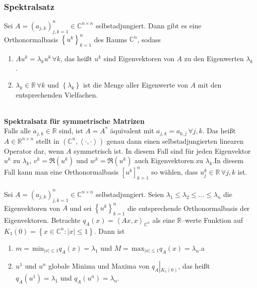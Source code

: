 \documentclass[a4paper,12pt]{article}
\begin{document}
\subsubsection{Spektralsatz}
Sei $A=\left(a_{j,k}\right)_{j,k=1}^n  \in \mathbb{C}^{n\times n}$ selbstadjungiert. Dann gibt es eine Orthonormalbasis $\left\{u^k\right\}_{k=1}^n$ des Raums $\mathbb{C}^n$, sodass
\begin{enumerate}[label=\arabic*.]
        \item $Au^k=\lambda _ku^k\,\forall k$, das heißt $u^k$ sind Eigenvektoren von $A$ zu den Eigenwerten $\lambda _k$.
        \item $\lambda _k \in \mathbb{R}\,\forall k$ und $\left\{\lambda _k\right\}$ ist die Menge aller Eigenwerte von $A$ mit den entsprechenden Vielfachen.
\end{enumerate}
\hfill\\\textbf{Spektralsatz für symmetrische Matrizen}\\ 
Falls alle $a_{j,k} \in \mathbb{R}$ sind, ist $A=A^*$ äquivalent mit $a_{j,k}=a_{k,j}\,\forall j,k$. Das heißt $A \in \mathbb{R}^{n\times n}$ stellt in $\left(\mathbb{C}^n,\left\langle \cdot ,\cdot \right\rangle \right)$ genau dann einen selbstadjungierten linearen Operator dar, wenn $A$ symmetrisch ist. In diesem Fall sind für jeden Eigenvektor $u^k$ zu $\lambda _k$, $v^k=\mathfrak{R}\left(u^k\right)$ und $w^k=\mathfrak{R}\left(u^k\right)$ auch Eigenvektoren zu $\lambda _k$.In diesem Fall kann man eine Orthonormalbasis $\left[u^k\right]_{k=1}^n$ so wählen, dass $u_j^k \in \mathbb{R}\,\forall j,k$ ist.\\\\\indent
Sei $A=\left(a_{j,k}\right)_{j,k=1}^n  \in \mathbb{C}^{n\times n}$ selbstadjungiert. Seien $\lambda _1\leq \lambda _2\leq \hdots \leq \lambda _n$ die Eigenvektoren von $A$ und sei $\left\{u^k\right\}_{k=1}^n$ die entsprechende Orthonormalbasis der Eigenvektoren. Betrachte $q_A(x)=\left\langle Ax,x\right\rangle _{\mathbb{C}^n}$ als eine $\mathbb{R}$--werte Funktion auf $\overline{K_1(0)}=\left\{x \in \mathbb{C}^n:|x|\leq 1\right\}$. Dann ist
\begin{enumerate}[label=\arabic*.]
        \item $m=\,\text{min}_{|x|\leq 1}q_A(x)=\lambda _1$ und $M=\,\text{max}_{|x|\leq 1}q_A(x)=\lambda _n$.a
        \item $u^1$ und $u^n$ globale Minima und Maxima von $q_A\left|_{\overline{K_1(0)}}\right.$, das heißt $q_A\left(u^1\right)=\lambda _1$ und $q_A\left(u^n\right)=\lambda _n$.
\end{enumerate}
\end{document}

